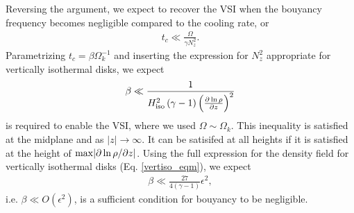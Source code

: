 Reversing the argument, we expect to recover the VSI when the bouyancy
frequency becomes negligible compared to the cooling rate, or 
\begin{align}
  t_c \ll \frac{\Omega}{\gamma N_z^2}. 
\end{align} 
Parametrizing $t_c = \beta\Omega_k^{-1}$ and inserting the expression
for $N_z^2$ appropriate for vertically isothermal disks, we expect
\begin{align}
  \beta \ll
  \frac{1}{H^2_\mathrm{iso}\left(\gamma-1\right)\left(\frac{\partial\ln\rho}{\partial
          z}\right)^2} 
\end{align}
is required to enable the VSI, where we used $\Omega\sim\Omega_k$.  
This inequality is satisfied at the
midplane and as $|z|\to\infty$. It can be satisifed at all heights if
it is satisfied at the height of $\mathrm{max}|\partial\ln\rho/\partial z|$. 
Using the full expression for the density field for vertically isothermal
disks (Eq. \ref{vertiso_eqm}), we expect 
\begin{align}
  \beta \ll \frac{27}{4(\gamma-1)}\epsilon^2,
\end{align}
i.e. $\beta\ll O(\epsilon^2)$, is a sufficient condition for
bouyancy to be negligible.  